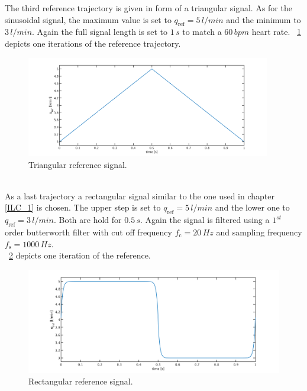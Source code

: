The third reference trajectory is given in form of a triangular signal. As for the sinusoidal signal, the maximum value is set to $q_{\mathrm{ref}}=5\,l/min$ and the minimum to $3\, l/min$. Again the full signal length is set to $1\,s$ to match a $60\,bpm$ heart rate. \figurename~\ref{fig:ref_triang} depicts one iterations of the reference trajectory.
\begin{figure}[ht]
  \centering
  \includegraphics[width=0.95\textwidth]{images/chapt_5/ILC/ref_triang.pdf}
  \caption[Triangular reference signal]{Triangular reference signal.}
  \label{fig:ref_triang}
\end{figure}
\\As a last trajectory a rectangular signal similar to the one used in chapter \ref{ILC_1} is chosen. The upper step is set to $q_{\mathrm{ref}}=5\,l/min$ and the lower one to $q_{\mathrm{ref}}=3\,l/min$. Both are hold for $0.5\,s$. Again the signal is filtered using a $1^{st}$ order butterworth filter with cut off frequency $f_{\mathrm{c}}=20\,Hz$ and sampling frequency $f_{\mathrm{s}}=1000\,Hz$.
\\\figurename~\ref{fig:ref_square} depicts one iteration of the reference.
\begin{figure}[ht]
  \centering
  \includegraphics[width=\textwidth]{images/chapt_5/ILC/ref_square.pdf}
  \caption[Rectangular reference signal]{Rectangular reference signal.}
  \label{fig:ref_square}
\end{figure}
%



